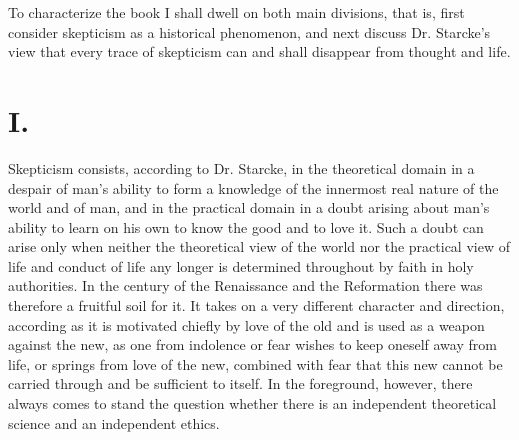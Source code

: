 \documentclass[12pt,a4paper,openany]{book}
\newcommand{\opage}[1]{\marginnote{\footnotesize\textit{[#1]}}}
\begin{document}
To characterize the book I shall dwell on both
main divisions, that is, first consider skepticism as a historical
phenomenon, and next discuss Dr. Starcke's view that
every trace of skepticism can and shall disappear from
thought and life.

\section*{I.}

Skepticism consists, according to Dr. Starcke, in the
theoretical domain in a despair of man's ability
to form a knowledge of the innermost real nature of the world and of man, and in the practical domain
\opage{18}in a doubt arising about man's ability to learn on
his own to know the good and to love it.
Such a doubt can arise only when neither the theoretical
view of the world nor the practical view of life and
conduct of life any longer is determined throughout by faith in holy
authorities. In the century of the Renaissance and the Reformation
there was therefore a fruitful soil for it. It takes on a
very different character and direction, according as it is
motivated chiefly by love of the old and is used as a weapon
against the new, as one from indolence or fear wishes to keep
oneself away from life, or springs from love of the
new, combined with fear that this new cannot be
carried through and be sufficient to itself. In the foreground, however,
there always comes to stand the question whether there is an independent
theoretical science and an independent ethics.
\end{document}
